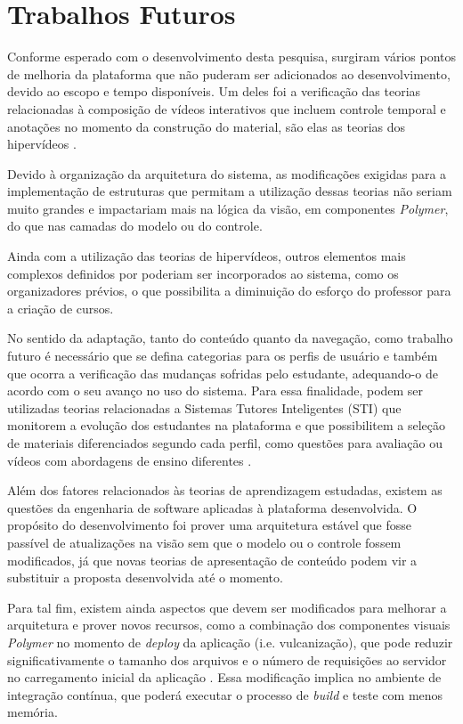 \section{Trabalhos Futuros}

Conforme esperado com o desenvolvimento desta pesquisa, surgiram vários pontos de melhoria da plataforma que não puderam ser adicionados ao desenvolvimento, devido ao escopo e tempo disponíveis. Um deles foi a verificação das teorias relacionadas à composição de vídeos interativos que incluem controle temporal e anotações no momento da construção do material, são elas as teorias dos hipervídeos \cite{Sadallah2012}.

Devido à organização da arquitetura do sistema, as modificações exigidas para a implementação de estruturas que permitam a utilização dessas teorias não seriam muito grandes e impactariam mais na lógica da visão, em componentes \textit{Polymer}, do que nas camadas do modelo ou do controle.

Ainda com a utilização das teorias de hipervídeos, outros elementos mais complexos definidos por  poderiam ser incorporados ao sistema, como os organizadores prévios, o que possibilita a diminuição do esforço do professor para a criação de cursos.

No sentido da adaptação, tanto do conteúdo quanto da navegação, como trabalho futuro é necessário que se defina categorias para os perfis de usuário e também que ocorra a verificação das mudanças sofridas pelo estudante, adequando-o de acordo com o seu avanço no uso do sistema. Para essa finalidade, podem ser utilizadas teorias relacionadas a Sistemas Tutores Inteligentes (STI) que monitorem a evolução dos estudantes na plataforma e que possibilitem a seleção de materiais diferenciados segundo cada perfil, como questões para avaliação ou vídeos com abordagens de ensino diferentes \cite{fragelli2010}.

Além dos fatores relacionados às teorias de aprendizagem estudadas, existem as questões da engenharia de software aplicadas à plataforma desenvolvida. O propósito do desenvolvimento foi prover uma arquitetura estável que fosse passível de atualizações na visão sem que o modelo ou o controle fossem modificados, já que novas teorias de apresentação de conteúdo podem vir a substituir a proposta desenvolvida até o momento.

Para tal fim, existem ainda aspectos que devem ser modificados para melhorar a arquitetura e prover novos recursos, como a combinação dos componentes visuais \textit{Polymer} no momento de \textit{deploy} da aplicação (i.e. vulcanização), que pode reduzir significativamente o tamanho dos arquivos e o número de requisições ao servidor no carregamento inicial da aplicação \cite{vulcanize2013}. Essa modificação implica no ambiente de integração contínua, que poderá executar o processo de \textit{build} e teste com menos memória.

